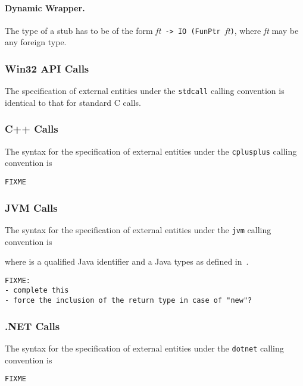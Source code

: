 \documentclass[a4paper,twosides]{article}
\newcommand{\code}[1]{\texttt{#1}}
\begin{document}
\paragraph{Dynamic Wrapper.}
The type of a  stub has to be of the form \textit{ft}\code{ ->
  }\code{IO (FunPtr }\textit{ft}\code), where \textit{ft} may be any foreign
type.

\subsubsection{Win32 API Calls}

The specification of external entities under the \code{stdcall} calling
convention is identical to that for standard C calls.

\subsubsection{C{+}{+} Calls}

The syntax for the specification of external entities under the
\code{cplusplus} calling convention is
%
\begin{verbatim}
FIXME
\end{verbatim}

\subsubsection{JVM Calls}

The syntax for the specification of external entities under the \code{jvm}
calling convention is 
%
\begin{grammar}
\end{grammar}
%
where  is a qualified Java identifier and  a Java
types as defined in~\cite{gosling-etal:Java}.

\begin{verbatim}
FIXME: 
- complete this
- force the inclusion of the return type in case of "new"?
\end{verbatim}

\subsubsection{.NET Calls}

The syntax for the specification of external entities under the \code{dotnet}
calling convention is
%
\begin{verbatim}
FIXME
\end{verbatim}
\end{document}
